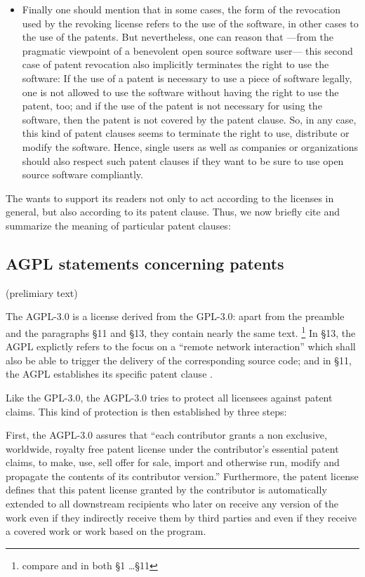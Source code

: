 \begin{itemize}
  \item Finally one should mention that in some cases, the form of the
  revocation used by the revoking license refers to the use of the software, in
  other cases to the use of the patents. But nevertheless, one can reason that%
  ---from the pragmatic viewpoint of a benevolent open source software user---%
  this second case of patent revocation also implicitly terminates the right to
  use the software: If the use of a patent is necessary to use a piece of
  software legally, one is not allowed to use the software without having the
  right to use the patent, too; and if the use of the patent is not necessary
  for using the software, then the patent is not covered by the patent clause.
  So, in any case, this kind of patent clauses seems to terminate the right to
  use, distribute or modify the software. Hence, single users as well
  as companies or organizations should also respect such patent clauses if they
  want to be sure to use open source software compliantly.
\end{itemize}

The \oslic{} wants to support its readers not only to act according to the licenses
in general, but also according to its patent clause. Thus, we now briefly cite
and summarize the meaning of particular patent clauses:

\subsection{AGPL statements concerning patents}\label{subsec:Agpl30PatentClause}

(prelimiary text)

The AGPL-3.0 is a license derived from the GPL-3.0: apart from the preamble and
the paragraphs §11 and §13, they contain nearly the same text.%
  \footnote{compare \cite[][\nopage]{Agpl30OsiLicense2007a} and
  \cite[][\nopage]{Gpl30OsiLicense2007a} in both §1 \ldots §11}
In §13, the AGPL explictly refers to the focus on a \enquote{remote network
interaction} which shall also be able to trigger the delivery of the
corresponding source code; and in §11, the AGPL establishes its specific patent
clause \cite[cf.][\nopage §11 and §13]{Agpl30OsiLicense2007a}.

Like the GPL-3.0, the AGPL-3.0 tries to protect all licensees against patent
claims. This kind of protection is then established by three steps:

First, the AGPL-3.0 assures that \enquote{each contributor grants a non
exclusive, worldwide, royalty free patent license under the contributor’s
essential patent claims, to make, use, sell offer for sale, import and
otherwise run, modify and propagate the contents of its contributor
version.} Furthermore, the patent license defines that this patent
license granted by the contributor is automatically extended to all downstream
recipients who later on receive any version of the work even if they indirectly
receive them by third parties and even if they receive a covered work or work
based on the program.

